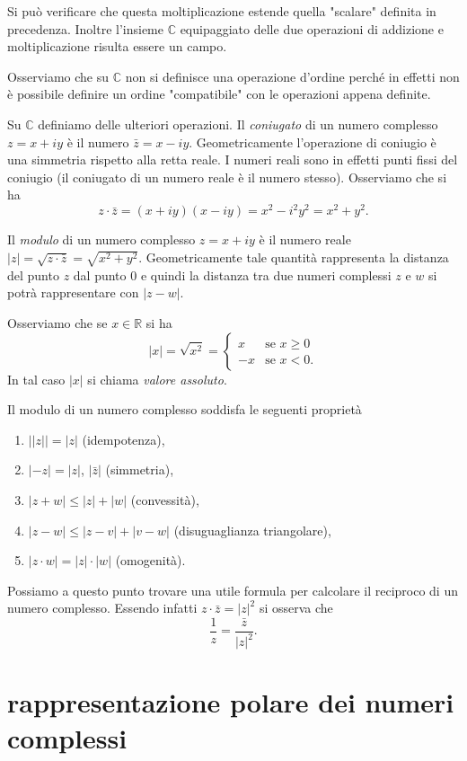 \documentclass[italian,a4paper,oneside,headinclude]{scrbook}
\newcommand{\myemph}[1]{\emph{#1}\marginpar{#1}}
\newcommand{\CC}{\mathbb C}
\newcommand{\RR}{\mathbb R}
\newcommand{\abs}[1]{{\left|#1\right|}}
\begin{document}
Si può verificare che questa moltiplicazione estende quella "scalare" definita
in precedenza. Inoltre l'insieme $\CC$ equipaggiato delle due operazioni di
addizione e moltiplicazione risulta essere un campo.

Osserviamo che su $\CC$ non si definisce una operazione d'ordine perché
in effetti non è possibile definire un ordine "compatibile" con le operazioni
appena definite.

Su $\CC$ definiamo delle ulteriori operazioni.
Il \myemph{coniugato} di un numero complesso $z=x+iy$ è il numero
$\bar z = x - iy$. Geometricamente l'operazione di coniugio è una simmetria
rispetto alla retta reale. I numeri reali sono in effetti punti fissi del
coniugio (il coniugato di un numero reale è il numero stesso).
Osserviamo che si ha
\[
z \cdot \bar z = (x+iy)(x-iy) = x^2-i^2y^2 = x^2+y^2.
\]

Il \myemph{modulo} di un numero complesso $z=x+iy$
è il numero reale $ \abs{z} = \sqrt{z\cdot\bar z} = \sqrt{x^2+y^2}$.
Geometricamente tale quantità rappresenta la distanza del punto $z$
dal punto $0$ e quindi la distanza tra due numeri complessi $z$ e
$w$ si potrà rappresentare con $\abs{z-w}$.

Osserviamo che se $x\in \RR$ si ha
\[
\abs{x}
= \sqrt{x^2}
=
\begin{cases}
  x &\text{se $x\ge 0$}\\
  -x &\text{se $x<0$}.
\end{cases}
\]
In tal caso $\abs{x}$ si chiama \myemph{valore assoluto}.

Il modulo di un numero complesso soddisfa le seguenti proprietà
\begin{enumerate}
\item $\abs{\abs{z}} = \abs{z}$ (idempotenza),
\item $\abs{-z} = \abs{z}$, $\abs{\bar z}$ (simmetria),
\item $\abs{z+w} \le \abs{z}+\abs{w}$ (convessità),
\item $\abs{z-w} \le \abs{z-v} + \abs{v-w}$ (disuguaglianza triangolare),
\item $\abs{z\cdot w} = \abs{z}\cdot\abs{w}$ (omogenità).
\end{enumerate}

Possiamo a questo punto trovare una utile formula per calcolare
il reciproco di un numero complesso. Essendo infatti
$z\cdot \bar z = \abs{z}^2$ si osserva che
\[
  \frac{1}{z} = \frac{\bar z}{\abs{z}^2}.
\]

\section{rappresentazione polare dei numeri complessi}
\end{document}
